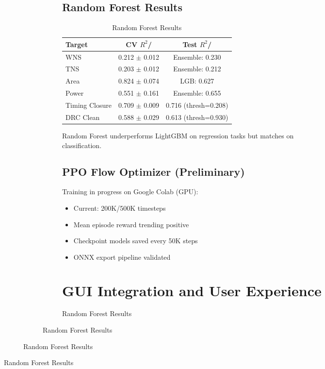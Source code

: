 \documentclass[10pt,conference]{IEEEtran}
\newcommand{\AUC}{\text{AUC}}
\begin{document}
\begin{figure}[t]
\begin{figure}[t]
\begin{figure}[t]
\begin{subfigure}{0.48\linewidth}
\subsection{Random Forest Results}

\begin{table}[t]
\centering
\caption{Random Forest Results}
\label{tab:rf_results}
\begin{tabular}{@{}lcc@{}}
\toprule
Target & CV $R^2$/\AUC{} & Test $R^2$/\AUC{} \\
\midrule
WNS & 0.212 $\pm$ 0.012 & Ensemble: 0.230 \\
TNS & 0.203 $\pm$ 0.012 & Ensemble: 0.212 \\
Area & 0.824 $\pm$ 0.074 & LGB: 0.627 \\
Power & 0.551 $\pm$ 0.161 & Ensemble: 0.655 \\
Timing Closure & 0.709 $\pm$ 0.009 & 0.716 (thresh=0.208) \\
DRC Clean & 0.588 $\pm$ 0.029 & 0.613 (thresh=0.930) \\
\bottomrule
\end{tabular}
\end{table}

Random Forest underperforms LightGBM on regression tasks but matches on classification.

\subsection{PPO Flow Optimizer (Preliminary)}

Training in progress on Google Colab (GPU):
\begin{itemize}
    \item Current: 200K/500K timesteps
    \item Mean episode reward trending positive
    \item Checkpoint models saved every 50K steps
    \item ONNX export pipeline validated
\end{itemize}


\section{GUI Integration and User Experience}
\label{sec:gui_integration}


\end{subfigure}
\end{figure}
\end{figure}
\end{figure}
\end{document}

